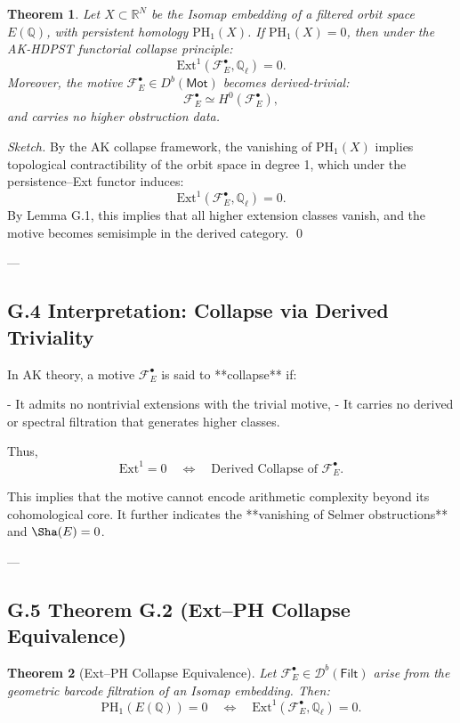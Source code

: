 \documentclass[11pt]{article}
\newtheorem{theorem}{Theorem}[section]
\theoremstyle{definition}
\begin{document}
\begin{theorem}
Let \( X \subset \mathbb{R}^N \) be the Isomap embedding of a filtered orbit space \( E(\mathbb{Q}) \), with persistent homology \( \mathrm{PH}_1(X) \).  
If \( \mathrm{PH}_1(X) = 0 \), then under the AK-HDPST functorial collapse principle:
\[
\mathrm{Ext}^1(\mathcal{F}_E^\bullet, \mathbb{Q}_\ell) = 0.
\]
Moreover, the motive \( \mathcal{F}_E^\bullet \in D^b(\mathsf{Mot}) \) becomes derived-trivial:
\[
\mathcal{F}_E^\bullet \simeq H^0(\mathcal{F}_E^\bullet),
\]
and carries no higher obstruction data.
\end{theorem}

\begin{proof}[Sketch]
By the AK collapse framework, the vanishing of \( \mathrm{PH}_1(X) \) implies topological contractibility of the orbit space in degree 1, which under the persistence–Ext functor induces:
\[
\mathrm{Ext}^1(\mathcal{F}_E^\bullet, \mathbb{Q}_\ell) = 0.
\]
By Lemma G.1, this implies that all higher extension classes vanish, and the motive becomes semisimple in the derived category.
\qed
\end{proof}


---

\subsection*{G.4 Interpretation: Collapse via Derived Triviality}

In AK theory, a motive \( \mathcal{F}_E^\bullet \) is said to **collapse** if:

- It admits no nontrivial extensions with the trivial motive,
- It carries no derived or spectral filtration that generates higher classes.

Thus,
\[
\mathrm{Ext}^1 = 0 \quad \Longleftrightarrow \quad \text{Derived Collapse of } \mathcal{F}_E^\bullet.
\]

This implies that the motive cannot encode arithmetic complexity beyond its cohomological core.  
It further indicates the **vanishing of Selmer obstructions** and \( \Sha(E) = 0 \).

---

\subsection*{G.5 Theorem G.2 (Ext–PH Collapse Equivalence)}

\begin{theorem}[Ext–PH Collapse Equivalence]
Let \( \mathcal{F}_E^\bullet \in \mathcal{D}^b(\mathsf{Filt}) \) arise from the geometric barcode filtration of an Isomap embedding. Then:
\[
\mathrm{PH}_1(E(\mathbb{Q})) = 0 \quad \Longleftrightarrow \quad \mathrm{Ext}^1(\mathcal{F}_E^\bullet, \mathbb{Q}_\ell) = 0.
\]
\end{theorem}
\end{document}
